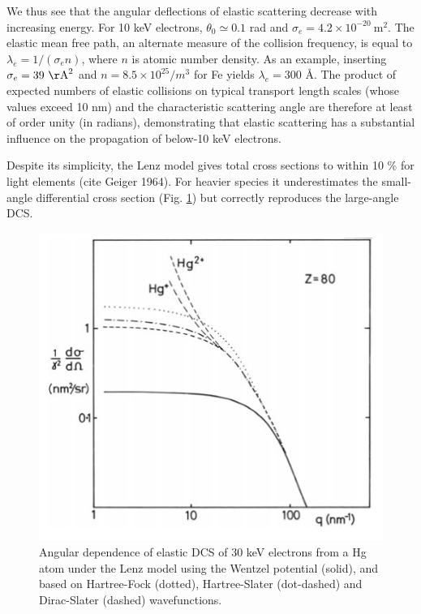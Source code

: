 \documentclass [11pt, proquest, article] {uwthesis}[2016/11/22]
\begin{document}
We thus see that the angular deflections of elastic scattering decrease with increasing energy. For 10 keV electrons, $\theta_0 \simeq 0.1$ rad and $\sigma_e = 4.2 \times 10^{-20}~\mathrm{m}^2$. The elastic mean free path, an alternate measure of the collision frequency, is equal to $\lambda_e = 1/(\sigma_e n)$, where $n$ is atomic number density. As an example, inserting $\sigma_e = 39~\mathrm{\AA}^2$ and $n = 8.5\times 10^{25}/m^3$ for Fe yields $\lambda_e = 300$ \AA. The product of expected numbers of elastic collisions on typical transport length scales (whose values exceed 10 nm) and the characteristic scattering angle are therefore at least of order unity (in radians), demonstrating that elastic scattering has a substantial influence on the propagation of below-10 keV electrons.


Despite its simplicity, the Lenz model gives total cross sections to within 10 \% for light elements (cite Geiger 1964). For heavier species it underestimates the small-angle differential cross section (Fig. \ref{fig:e3.3}) but correctly reproduces the large-angle DCS.

\begin{figure}[h] 
	\caption{Angular dependence of elastic DCS of 30 keV electrons from a Hg atom under the Lenz model using the Wentzel potential (solid), and based on Hartree-Fock (dotted), Hartree-Slater (dot-dashed) and Dirac-Slater (dashed) wavefunctions.  \parencite{Reference1} }
	\label{fig:e3.3}
\centering
\includegraphics[scale=0.5]{../Figures/egerton_3_3.png}
\end{figure}
\end{document}
